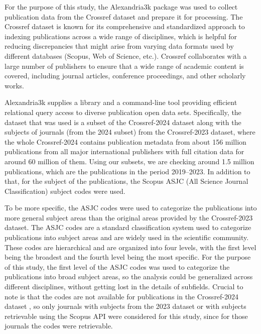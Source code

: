 For the purpose of this study, the Alexandria3k \cite{Spi23g} package was used
to collect publication data from the Crossref dataset \cite{Crossref2020} and
prepare it for processing. The Crossref dataset is known for its comprehensive
and standardized approach to indexing publications across a wide range of
disciplines, which is helpful for reducing discrepancies that might arise from
varying data formats used by different databases (Scopus, Web of Science,
etc.). Crossref collaborates with a large number of publishers to ensure that a
wide range of academic content is covered, including journal articles,
conference proceedings, and other scholarly works.

Alexandria3k supplies a library and a command-line tool providing efficient
relational query access to diverse publication open data sets. Specifically,
the dataset that was used is a subset of the Crossref-2024 dataset along with
the subjects of journals (from the 2024 subset) from the Crossref-2023 dataset,
where the whole Crossref-2024 contains publication metadata from about 156
million publications from all major international publishers with full citation
data for around 60 million of them. Using our subsets, we are checking around
1.5 million publications, which are the publications in the period 2019--2023.
In addition to that, for the subject of the publications, the Scopus ASJC (All
Science Journal Classification) subject codes were used.

To be more specific, the ASJC codes were used to categorize the publications
into more general subject areas than the original areas provided by the
Crossref-2023 dataset. The ASJC codes are a standard classification system used
to categorize publications into subject areas and are widely used in the
scientific community. These codes are hierarchical and are organized into four
levels, with the first level being the broadest and the fourth level being the
most specific. For the purpose of this study, the first level of the ASJC codes
was used to categorize the publications into broad subject areas, so the
analysis could be generalized across different disciplines, without getting
lost in the details of subfields. Crucial to note is that the codes are not
available for publications in the Crossref-2024 dataset
\cite{crossrefSubjectCodes2024}, so only journals with subjects from the 2023
dataset or with subjects retrievable using the Scopus API
\cite{elsevier_dev_portal} were considered for this study, since for those
journals the codes were retrievable.

